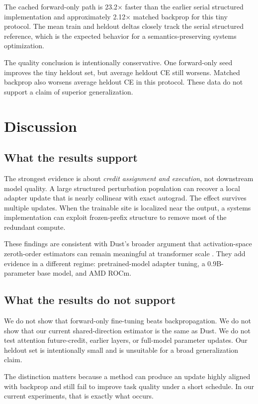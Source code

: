 \documentclass[11pt]{article}
\begin{document}
The cached forward-only path is 23.2$\times$ faster than the earlier serial
structured implementation and approximately 2.12$\times$ matched backprop
for this tiny protocol. The mean train and heldout deltas closely track the
serial structured reference, which is the expected behavior for a
semantics-preserving systems optimization.

The quality conclusion is intentionally conservative. One forward-only seed
improves the tiny heldout set, but average heldout CE still worsens. Matched
backprop also worsens average heldout CE in this protocol. These data do not
support a claim of superior generalization.

\section{Discussion}

\subsection{What the results support}

The strongest evidence is about \emph{credit assignment and execution}, not
downstream model quality. A large structured perturbation population can
recover a local adapter update that is nearly collinear with exact autograd.
The effect survives multiple updates. When the trainable site is localized
near the output, a systems implementation can exploit frozen-prefix structure
to remove most of the redundant compute.

These findings are consistent with Dust's broader argument that
activation-space zeroth-order estimators can remain meaningful at transformer
scale \citep{dahal2026dust}. They add evidence in a different regime:
pretrained-model adapter tuning, a 0.9B-parameter base model, and AMD ROCm.

\subsection{What the results do not support}

We do not show that forward-only fine-tuning beats backpropagation. We do not
show that our current shared-direction estimator is the same as Dust. We do
not test attention future-credit, earlier layers, or full-model parameter
updates. Our heldout set is intentionally small and is unsuitable for a broad
generalization claim.

The distinction matters because a method can produce an update highly aligned
with backprop and still fail to improve task quality under a short schedule.
In our current experiments, that is exactly what occurs.
\end{document}
